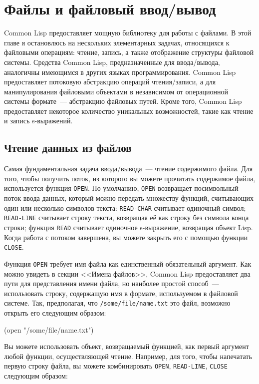 \chapter{Файлы и файловый ввод/вывод}
\label{ch:14}

\thispagestyle{empty}

Common Lisp предоставляет мощную библиотеку для работы с файлами. В этой главе я
остановлюсь на нескольких элементарных задачах, относящихся к файловыми операциям: чтение,
запись, а также отображение структуры файловой системы. Средства Common Lisp,
предназначенные для ввода/вывода, аналогичны имеющимся в других языках
программирования. Common Lisp предоставляет потоковую абстракцию операций чтения/записи, а
для манипулирования файловыми объектами в независимом от операционной системы формате~---
абстракцию файловых путей. Кроме того, Common Lisp предоставляет некоторое
количество уникальных возможностей, такие как чтение и запись s-выражений.

\section{Чтение данных из файлов}

Самая фундаментальная задача ввода/вывода~--- чтение содержимого файла. Для того, чтобы
получить поток, из которого вы можете прочитать содержимое файла, используется функция
\lstinline{OPEN}. По умолчанию, \lstinline{OPEN} возвращает посимвольный поток ввода данных, который
можно передать множеству функций, считывающих один или несколько символов текста:
\lstinline{READ-CHAR} считывает одиночный символ; \lstinline{READ-LINE} считывает строку текста,
возвращая её как строку без символа конца строки; функция \lstinline{READ} считывает одиночное
s-выражение, возвращая объект Lisp. Когда работа с потоком завершена, вы можете закрыть
его с помощью функции \lstinline{CLOSE}.

Функция \lstinline{OPEN} требует имя файла как единственный обязательный аргумент. Как можно
увидеть в секции <<Имена файлов>>, Common Lisp предоставляет два пути для представления
имени файла, но наиболее простой способ~--- использовать строку, содержащую имя в формате,
используемом в файловой системе. Так, предполагая, что \lstinline{/some/file/name.txt} это
файл, возможно открыть его следующим образом:

\begin{myverb}
(open "/some/file/name.txt")
\end{myverb}

Вы можете использовать объект, возвращаемый функцией, как первый аргумент любой функции,
осуществляющей чтение. Например, для того, чтобы напечатать первую строку файла, вы можете
комбинировать \lstinline{OPEN}, \lstinline{READ-LINE}, \lstinline{CLOSE} следующим образом:

